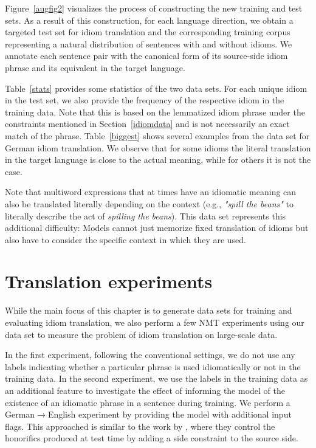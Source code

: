 Figure~\ref{augfig2} visualizes the process of constructing the new training and test sets.
As a result of this construction, for each language direction, we obtain a targeted test set for idiom translation and the corresponding training corpus representing a natural distribution of sentences with and without idioms.
We annotate each sentence pair with the canonical form of its source-side idiom phrase and its equivalent in the target language. 

Table~\ref{stats} provides some statistics of the two data sets. 
For each unique idiom in the test set, we also provide the frequency of the respective idiom in the training data. 
Note that this is based on the lemmatized idiom phrase under the constraints mentioned in Section~\ref{idiomdata} and is not necessarily an exact match of the phrase.
Table~\ref{biggest} shows several examples from the data set for German idiom translation. 
We observe that for some idioms the literal translation in the target language is close to the actual meaning, while for others it is not the case.

Note that multiword expressions that at times have an idiomatic meaning can also be translated literally depending on the context (e.g., \textit{"spill the beans"} to literally describe the act of \textit{spilling the beans}). 
This data set represents this additional difficulty: Models cannot just memorize fixed translation of idioms but also have to consider the specific context in which they are used.

\section{Translation experiments} \label{idexperiments}
    
While the main focus of this chapter is to generate data sets for training and evaluating idiom translation, we also perform a few NMT experiments using our data set to measure the problem of idiom translation on large-scale data. 

In the first experiment, following the conventional settings, we do not use any labels indicating whether a particular phrase is used idiomatically or not in the training data.
In the second experiment, we use the labels in the training data as an additional feature to investigate the effect of informing the model of the existence of an idiomatic phrase in a sentence during training.
We perform %
a German$\rightarrow$English experiment by providing the model with additional input flags.
This approached is similar to the work by \citet{sennrich-etal-2016-controlling}, where they control the honorifics produced at test time by adding a side constraint to the source side. 

